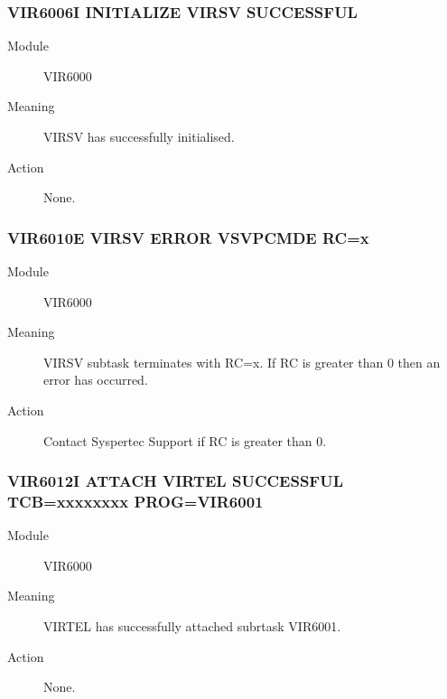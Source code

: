 \documentclass[letterpaper,10pt,english]{sphinxmanual}
\begin{document}
\subsubsection{VIR6006I INITIALIZE VIRSV SUCCESSFUL}
\label{\detokenize{messages:vir6006i-initialize-virsv-successful}}\begin{description}
\item[{Module}] \leavevmode
VIR6000

\item[{Meaning}] \leavevmode
VIRSV has successfully initialised.

\item[{Action}] \leavevmode
None.

\end{description}


\subsubsection{VIR6010E VIRSV ERROR VSVPCMDE RC=x}
\label{\detokenize{messages:vir6010e-virsv-error-vsvpcmde-rc-x}}\begin{description}
\item[{Module}] \leavevmode
VIR6000

\item[{Meaning}] \leavevmode
VIRSV subtask terminates with RC=x. If RC is greater than 0 then an error has occurred.

\item[{Action}] \leavevmode
Contact Syspertec Support if RC is greater than 0.

\end{description}


\subsubsection{VIR6012I ATTACH VIRTEL SUCCESSFUL TCB=xxxxxxxx PROG=VIR6001}
\label{\detokenize{messages:vir6012i-attach-virtel-successful-tcb-xxxxxxxx-prog-vir6001}}\begin{description}
\item[{Module}] \leavevmode
VIR6000

\item[{Meaning}] \leavevmode
VIRTEL has successfully attached subrtask VIR6001.

\item[{Action}] \leavevmode
None.

\end{description}
\end{document}
